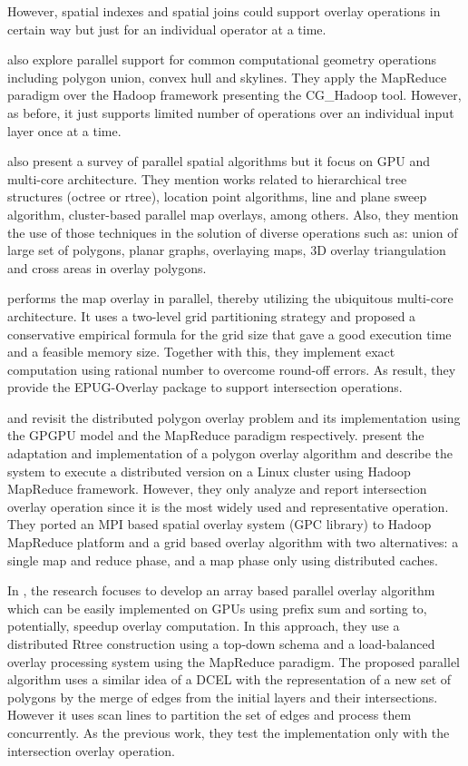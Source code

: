 However, spatial indexes and spatial joins could support overlay operations in certain way but just for an individual operator at a time. 

\cite{li_scalable_2019} also explore parallel support for common computational geometry operations including polygon union, convex hull and skylines.  They apply the MapReduce paradigm over the Hadoop framework presenting the CG\_Hadoop tool.  However, as before, it just supports limited number of operations over an individual input layer once at a time.

\cite{franklin_data_2018} also present a survey of parallel spatial algorithms but it focus on GPU and multi-core architecture.  They mention works related to hierarchical tree structures (octree or rtree), location point algorithms, line and plane sweep algorithm, cluster-based parallel map overlays, among others.  Also, they mention the use of those techniques in the solution of diverse operations such as: union of large set of polygons, planar graphs, overlaying maps, 3D overlay triangulation and cross areas in overlay polygons.

\cite{magalhaes_fast_2015} performs the map overlay in parallel, thereby utilizing the ubiquitous multi-core architecture.  It uses a two-level grid partitioning strategy and proposed a conservative empirical formula for the grid size that gave a good execution time and a feasible memory size.  Together with this, they implement exact computation using rational number to overcome round-off errors. As result, they provide the EPUG-Overlay package to support intersection operations.

\cite{puri_efficient_2013} and \cite{puri_mapreduce_2013} revisit the distributed polygon overlay problem and its implementation using the GPGPU model and the MapReduce paradigm respectively.  \cite{puri_mapreduce_2013} present the adaptation and implementation of a polygon overlay algorithm and describe the system to execute a distributed version on a Linux cluster using Hadoop MapReduce framework.  However, they only analyze and report intersection overlay operation since it is the most widely used and representative operation.  They ported an MPI based spatial overlay system (GPC library) to Hadoop MapReduce platform and a grid based overlay algorithm with two alternatives: a single map and reduce phase, and a map phase only using distributed caches.

In \cite{puri_efficient_2013}, the research focuses to develop an array based parallel overlay algorithm which can be easily implemented on GPUs using prefix sum and sorting to,  potentially, speedup overlay computation.  In this approach, they use a distributed Rtree construction using a top-down schema and a load-balanced overlay processing system using the MapReduce paradigm.  The proposed parallel algorithm uses a similar idea of a DCEL with the representation of a new set of polygons by the merge of edges from the initial layers and their intersections.  However it uses scan lines to partition the set of edges and process them concurrently. As the previous work, they test the implementation only with the intersection overlay operation.

